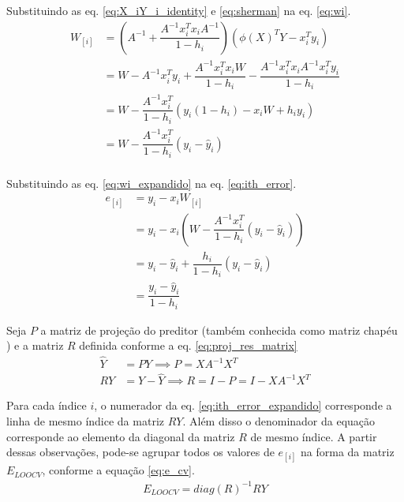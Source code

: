 Substituindo as eq. \ref{eq:X_iY_i_identity} e \ref{eq:sherman} na eq. \ref{eq:wi}.
\smallskip\noindent
\begin{equation}
    \begin{split}
        W_{[i]} &= \left(A^{-1} + \dfrac{A^{-1}x_i^Tx_iA^{-1}}{1-h_i}\right) \left(\phi(X)^TY - x_i^Ty_i\right)\\
                &= W - A^{-1}x_i^Ty_i + \dfrac{A^{-1}x_i^Tx_iW}{1-h_i} - \dfrac{A^{-1}x_i^Tx_iA^{-1}x_i^Ty_i}{1-h_i} \\
                &= W - \dfrac{A^{-1}x_i^T}{1-h_i}\left(  y_i(1-h_i)-x_iW  + h_iy_i \right)  \\
                &= W - \dfrac{A^{-1}x_i^T}{1-h_i}\left(  y_i-\hat{y}_i \right)  \\
    \end{split}
    \label{eq:wi_expandido}
\end{equation}

Substituindo as eq. \ref{eq:wi_expandido} na eq. \ref{eq:ith_error}.
\smallskip\noindent
\begin{equation}
    \begin{split}
        e_{[i]} &= y_i - x_iW_{[i]} \\
                &= y_i - x_i\left( W - \dfrac{A^{-1}x_i^T}{1-h_i}\left(  y_i-\hat{y}_i \right) \right) \\
                &= y_i - \hat{y}_i + \dfrac{h_i}{1-h_i}\left(  y_i-\hat{y}_i \right) \\
                &= \dfrac{y_i- \hat{y}_i}{1-h_i}
    \end{split}    
    \label{eq:ith_error_expandido}
\end{equation}

Seja $P$ a matriz de projeção \cite[p. 303]{applied_matrix_algebra} do preditor (também conhecida como matriz chapéu
 \cite[p. 266]{lin_reg_analysis}) e a matriz $R$ definida conforme a eq. \ref{eq:proj_res_matrix}
\smallskip\noindent
\begin{equation}
    \begin{split}
        \hat{Y} &= PY \implies P = XA^{-1}X^T \\
        RY &= Y - \hat{Y} \implies R = I - P = I - XA^{-1}X^T
    \end{split}    
    \label{eq:proj_res_matrix}
\end{equation}

Para cada índice $i$, o numerador da eq. \ref{eq:ith_error_expandido} corresponde a linha de mesmo índice da matriz $RY$. 
Além disso o denominador da equação corresponde ao elemento da diagonal da matriz $R$ de mesmo índice. 
A partir dessas observações, pode-se agrupar todos os valores de $e_{[i]}$ na forma da matriz $E_{LOOCV}$, conforme a equação \ref{eq:e_cv}.
\smallskip\noindent
\begin{equation}
    \begin{split}
        E_{LOOCV} = diag(R)^{-1}RY
    \end{split}    
    \label{eq:e_cv}
\end{equation}

